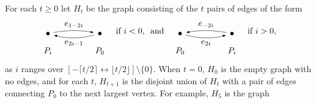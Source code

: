 \documentclass{amsproc}
\theoremstyle{definition}
\theoremstyle{remark}
\numberwithin{equation}{section}
\newcommand{\nodeDist}{2}
\newcommand{\interval}{\longleftrightarrow}
\begin{document}
For each $t\geqslant 0$ let $H_t$ be the graph consisting of the $t$ pairs of edges of the form
\[
\begin{tikzpicture}[baseline,vertex/.style={anchor=base, circle, fill,minimum size=4pt, inner sep=0pt, outer sep=0pt},auto,
                               edge/.style={->,>=latex, shorten > = 5pt,shorten < = 5pt},
position/.style args={#1:#2 from #3}{
    at=(#3.#1), anchor=#1+180, shift=(#1:#2)
}]
  \node[vertex] (v1) {};
  \node[vertex,position = 0:{\nodeDist} from v1] (v2) {};

  \draw (v1) node[below = 13] {$P_{i}$};
  \draw (v2) node[below = 13] {$P_{0}$};

  \draw[edge] (v1) to [bend left=10] node[above] {$e_{1-2i}$} (v2);
  \draw[edge] (v2) to [bend left=15] node[below] {$e_{2i-1}$} (v1);
\end{tikzpicture}
\quad\text{if $i<0$,}\ \ \text{and}\quad
\begin{tikzpicture}[baseline,vertex/.style={anchor=base, circle, fill,minimum size=4pt, inner sep=0pt, outer sep=0pt},auto,
                               edge/.style={->,>=latex, shorten > = 5pt,shorten < = 5pt},
position/.style args={#1:#2 from #3}{
    at=(#3.#1), anchor=#1+180, shift=(#1:#2)
}]
  \node[vertex] (v1) {};
  \node[vertex,position = 0:{\nodeDist} from v1] (v2) {};

  \draw (v1) node[below = 13] {$P_{0}$};
  \draw (v2) node[below = 13] {$P_{i}$};

  \draw[edge] (v1) to [bend right=15] node[below] {$e_{2i}$} (v2);
  \draw[edge] (v2) to [bend right=10] node[above] {$e_{-2i}$} (v1);
\end{tikzpicture}
\quad\text{if $i>0$,}
\]
as $i$ ranges over $[ - \lceil t/2 \rceil \interval \lfloor t/2 \rfloor ]\setminus \{0\}$.
When $t=0$, $H_0$ is the empty graph with no edges, and for each $t$, $H_{t+1}$ is the disjoint union of $H_t$ 
with a pair of edges connecting $P_0$ to the next largest vertex. For example, $H_5$ is the graph
\end{document}
